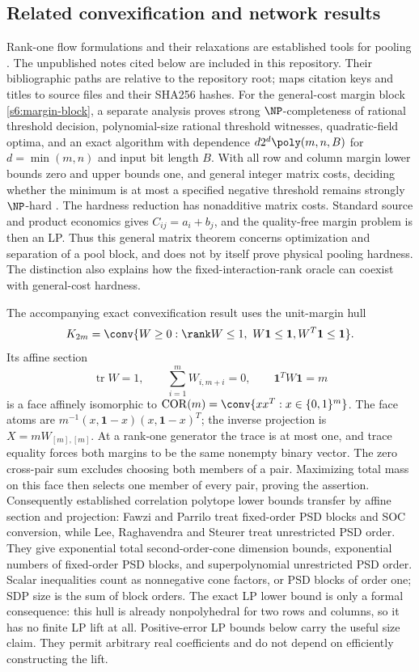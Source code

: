 \subsection{Related convexification and network results}\label{s6:related}
Rank-one flow formulations and their relaxations are established tools
for pooling \cite{dey2020-convexifications-of-rank-one-based,gupte2017-relaxations-and-discretizations-for-the}.
The unpublished notes cited below are included in this repository. Their
bibliographic paths are relative to the repository root;
 maps citation keys and titles to
source files and their SHA256 hashes.
For the general-cost margin block \eqref{s6:margin-block}, a separate
analysis \cite{s6:margin-note} proves strong $\NP$-completeness of
rational threshold decision, polynomial-size rational threshold witnesses,
quadratic-field optima, and an exact algorithm with dependence
$d2^d\poly(m,n,B)$ for $d=\min(m,n)$ and input bit length $B$.
With all row and column margin lower bounds zero and upper bounds one,
and general integer matrix costs, deciding whether the minimum is at
most a specified negative threshold remains strongly $\NP$-hard
\cite{s6:zero-lower-note}.
The hardness reduction has nonadditive matrix costs. Standard source
and product economics gives $C_{ij}=a_i+b_j$, and the quality-free
margin problem is then an LP. Thus this general matrix theorem concerns
optimization and separation of a pool block, and does not by itself
prove physical pooling hardness. The distinction also explains how the
fixed-interaction-rank oracle can coexist with general-cost hardness.

The accompanying exact convexification result \cite{s6:face-note}
uses the unit-margin hull
\[
 K_{2m}=\conv\{W\ge0:\rank W\le1,\ W\mathbf1\le\mathbf1,
 W^T\mathbf1\le\mathbf1\}.
\]
Its affine section
\[
 \operatorname{tr}W=1,\qquad\sum_{i=1}^mW_{i,m+i}=0,
 \qquad\mathbf1^TW\mathbf1=m
\]
is a face affinely isomorphic to
$\operatorname{COR}(m)=\conv\{xx^T:x\in\{0,1\}^m\}$.
The face atoms are
$m^{-1}(x,\mathbf1-x)(x,\mathbf1-x)^T$; the inverse projection is
$X=mW_{[m],[m]}$. At a rank-one generator the trace is at most one,
and trace equality forces both margins to be the same nonempty binary
vector. The zero cross-pair sum excludes choosing both members of a
pair. Maximizing total mass on this face then selects one member of
every pair, proving the assertion. Consequently established correlation
polytope lower bounds transfer by affine section and projection:
Fawzi and Parrilo \cite[Theorem~1]{s6:fawzi2013} treat fixed-order PSD
blocks and SOC conversion, while Lee, Raghavendra and Steurer
\cite[Theorem~1.1]{s6:lrs-full} treat unrestricted PSD order.
They give exponential total second-order-cone dimension bounds,
exponential numbers of fixed-order PSD blocks, and superpolynomial
unrestricted PSD order. Scalar inequalities count as nonnegative cone
factors, or PSD blocks of order one; SDP size is the sum of block orders.
The exact LP lower bound is only a formal consequence: this hull is
already nonpolyhedral for two rows and columns, so it has no finite LP
lift at all. Positive-error LP bounds below carry the useful size claim. They permit arbitrary real coefficients and do not depend
on efficiently constructing the lift.

